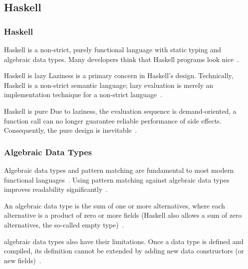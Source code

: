 \subsection{Haskell}
\begin{frame}\frametitle{Haskell}

Haskell is a non-strict, purely functional language with static typing and algebraic data types. Many developers think that Haskell programs look nice~\cite{history-of-haskell}.

\footnotesize

\begin{block}{Haskell is lazy}
    Laziness is a primary concern in Haskell's design. Technically, Haskell is a non-strict semantic language; lazy evaluation is merely an implementation technique for a non-strict language~\cite{history-of-haskell}.
\end{block}

\begin{block}{Haskell is pure}
Due to laziness, the evaluation sequence is demand-oriented, a function call can no longer guarantee reliable performance of side effects. Consequently, the pure design is inevitable~\cite{history-of-haskell}.
\end{block}

\end{frame}

\begin{frame}\frametitle{Algebraic Data Types}

Algebraic data types and pattern matching are fundamental to most modern functional languages~\cite{trees-that-grow}. Using pattern matching against algebraic data types improves readability significantly~\cite{history-of-haskell}.

An algebraic data type is the sum of one or more alternatives, where each alternative is a product of zero or more fields (Haskell also allows a sum of zero alternatives, the so-called empty type)~\cite{history-of-haskell}. 
        

algebraic data types also have their limitations. Once a data type is defined and compiled, its definition cannot be extended by adding new data constructors (or new fields)~\cite{trees-that-grow}.

\end{frame}

